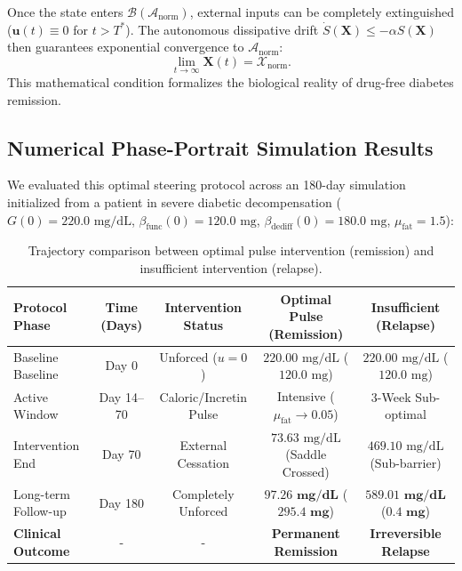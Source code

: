 \documentclass[11pt,a4paper]{article}
\begin{document}
Once the state enters $\mathcal{B}(\mathcal{A}_{\mathrm{norm}})$, external inputs can be completely extinguished ($\bm{u}(t) \equiv 0$ for $t > T^*$). The autonomous dissipative drift $\dot{S}(\bm{X}) \le -\alpha S(\bm{X})$ then guarantees exponential convergence to $\mathcal{A}_{\mathrm{norm}}$:
\begin{equation}
\lim_{t \to \infty} \bm{X}(t) = \mathcal{X}_{\mathrm{norm}}.
\end{equation}
This mathematical condition formalizes the biological reality of drug-free diabetes remission.

\subsection{Numerical Phase-Portrait Simulation Results}

We evaluated this optimal steering protocol across an 180-day simulation initialized from a patient in severe diabetic decompensation ($G(0) = 220.0\text{ mg/dL}$, $\beta_{\mathrm{func}}(0) = 120.0\text{ mg}$, $\beta_{\mathrm{dediff}}(0) = 180.0\text{ mg}$, $\mu_{\mathrm{fat}} = 1.5$):

\begin{table}[htbp]
\centering
\small
\caption{Trajectory comparison between optimal pulse intervention (remission) and insufficient intervention (relapse).}
\label{tab:t2d_results}
\begin{tabular}{lcccc}
\toprule
\textbf{Protocol Phase} & \textbf{Time (Days)} & \textbf{Intervention Status} & \textbf{Optimal Pulse (Remission)} & \textbf{Insufficient (Relapse)} \\
\midrule
Baseline Baseline & Day 0 & Unforced ($u=0$) & $220.00\text{ mg/dL}$ ($120.0\text{ mg}$) & $220.00\text{ mg/dL}$ ($120.0\text{ mg}$) \\
Active Window & Day 14--70 & Caloric/Incretin Pulse & Intensive ($\mu_{\mathrm{fat}} \to 0.05$) & 3-Week Sub-optimal \\
Intervention End & Day 70 & External Cessation & $73.63\text{ mg/dL}$ (Saddle Crossed) & $469.10\text{ mg/dL}$ (Sub-barrier) \\
Long-term Follow-up & Day 180 & Completely Unforced & $\mathbf{97.26\text{ mg/dL}}$ ($\mathbf{295.4\text{ mg}}$) & $\mathbf{589.01\text{ mg/dL}}$ ($\mathbf{0.4\text{ mg}}$) \\
\midrule
\textbf{Clinical Outcome} & - & - & \textbf{Permanent Remission} & \textbf{Irreversible Relapse} \\
\bottomrule
\end{tabular}
\end{table}
\end{document}
